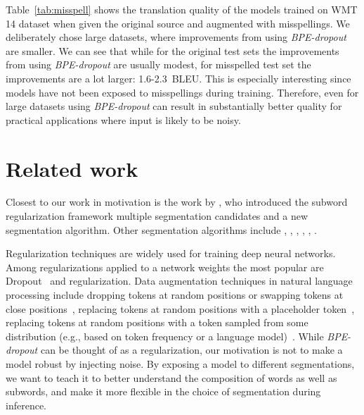 \documentclass[11pt,a4paper]{article}
\begin{document}
Table~\ref{tab:misspell} shows the translation quality of the models trained on WMT 14 dataset when given the original source and augmented with misspellings. We deliberately chose large datasets, where improvements from using \textit{BPE-dropout} are smaller. We can see that while for the original test sets the improvements from using \textit{BPE-dropout} are usually modest, for misspelled test set the improvements are a lot larger: 1.6-2.3~BLEU. This is especially interesting since models have not been exposed to misspellings during training. Therefore, even for large datasets using \textit{BPE-dropout} can result in substantially better quality for practical applications where input is likely to be noisy.

 
\section{Related work}


Closest to our work in motivation is the work by \citet{sentencepiece}, who introduced the subword regularization framework multiple segmentation candidates 
and a new segmentation algorithm. 
Other segmentation  algorithms include \citet{creutz2006morfessor}, \citet{schuster2012japanese}, \citet{chitnis-denero-2015-variable}, \citet{kunchukuttan-bhattacharyya-2016-orthographic}, \citet{wu2018finding}, \citet{banerjee-bhattacharyya-2018-meaningless}.

Regularization techniques are widely used for training deep neural networks. Among regularizations applied to a network weights the most popular are Dropout~\cite{srivastava2014dropout} and  regularization. Data augmentation techniques in natural language processing include dropping  tokens at random positions or swapping tokens at close positions~\cite{iyyer-etal-2015-deep,artetxe-etal-2018-unsupervised,lample2018unsupervised}, replacing tokens at random positions with a placeholder token~\cite{xie2017datanoising}, replacing tokens at random positions with a token sampled from some distribution (e.g., based on token frequency or a language model)~\cite{fadaee-etal-2017-data,xie2017datanoising,kobayashi-2018-contextual}. While \textit{BPE-dropout} can be thought of as a regularization, our motivation is not to make a model robust by injecting noise. By exposing a model to different segmentations, we want to teach it to better understand the composition of words as well as subwords, and make it more flexible in the choice of segmentation during inference.
\end{document}
